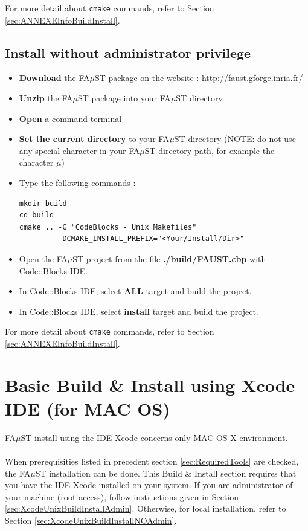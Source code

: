 For more detail about \texttt{cmake} commands, refer to Section \ref{sec:ANNEXEInfoBuildInstall}.


\subsection{Install without administrator privilege}\label{sec:CodeBlocUnixBuildInstallNOAdmin}
\begin{itemize}
\item \textbf{Download} the FA$\mu$ST package on the website :  \url{http://faust.gforge.inria.fr/}
\item \textbf{Unzip} the FA$\mu$ST package into your FA$\mu$ST directory.
\item \textbf{Open} a command terminal
\item \textbf{Set the current directory} to your FA$\mu$ST directory (NOTE: do not use any special character in your FA$\mu$ST directory path, for example the character $\mu$)
\item Type the following commands : 
\begin{lstlisting}
mkdir build
cd build
cmake .. -G "CodeBlocks - Unix Makefiles"
		 -DCMAKE_INSTALL_PREFIX="<Your/Install/Dir>"
\end{lstlisting}

\item Open the FA$\mu$ST project from the file \textbf{./build/FAUST.cbp} with Code::Blocks IDE. 
\item In Code::Blocks IDE, select \textbf{ALL} target and build the project. 
\item In Code::Blocks IDE, select \textbf{install} target and build the project. 
\end{itemize}

For more detail about \texttt{cmake} commands, refer to Section \ref{sec:ANNEXEInfoBuildInstall}.


\section{Basic Build \& Install using Xcode IDE (for MAC OS)}\label{sec:MacInstallXcode}

FA$\mu$ST install using the IDE Xcode concerns only MAC OS X environment.
\paragraph{}When prerequisities listed in precedent section \ref{sec:RequiredTools} are checked, the FA$\mu$ST installation can be done. This Build \& Install section requires that you have the IDE Xcode installed on your system. If you are administrator of your machine (root access), follow instructions given in Section \ref{sec:XcodeUnixBuildInstallAdmin}. Otherwise, for local installation, refer to Section \ref{sec:XcodeUnixBuildInstallNOAdmin}. 

